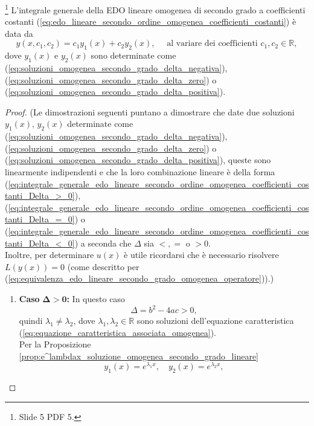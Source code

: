 \begin{theorem}\footnote{Slide 5 PDF 5.}
	L'integrale generale della EDO lineare omogenea di secondo grado a coefficienti costanti (\ref{eq:edo_lineare_secondo_ordine_omogenea_coefficienti_costanti}) è data da
	\begin{equation}\label{eq:integrale_generale_edo_lineare_secondo_ordine_omogenea_coefficienti_costanti}
		y(x,c_1,c_2) = c_1y_1(x) + c_2y_2(x),\quad \text{ al variare dei coefficienti } c_1,c_2\in\mathbb{R},
	\end{equation}
	dove $y_1(x)$ e $y_2(x)$ sono determinate come (\ref{eq:soluzioni_omogenea_secondo_grado_delta_negativa}), (\ref{eq:soluzioni_omogenea_secondo_grado_delta_zero}) o  (\ref{eq:soluzioni_omogenea_secondo_grado_delta_positiva}).
\end{theorem}
\begin{proof}
	(Le dimostrazioni seguenti puntano a dimostrare che date due soluzioni $y_1(x),\, y_2(x)$ determinate come (\ref{eq:soluzioni_omogenea_secondo_grado_delta_negativa}), (\ref{eq:soluzioni_omogenea_secondo_grado_delta_zero}) o  (\ref{eq:soluzioni_omogenea_secondo_grado_delta_positiva}), queste sono linearmente indipendenti e che la loro combinazione lineare è della forma (\ref{eq:integrale_generale_edo_lineare_secondo_ordine_omogenea_coefficienti_costanti_Delta_>_0}), (\ref{eq:integrale_generale_edo_lineare_secondo_ordine_omogenea_coefficienti_costanti_Delta_=_0}) o (\ref{eq:integrale_generale_edo_lineare_secondo_ordine_omogenea_coefficienti_costanti_Delta_<_0}) a seconda che $\Delta$ sia $<,=$ o $>0$.\\
	Inoltre, per determinare $u(x)$ è utile ricordarsi che è necessario risolvere $L(y(x))=0$ (come descritto per (\ref{eq:equivalenza_edo_lineare_secondo_grado_omogenea_operatore})).)
	\begin{enumerate}
		\item \textbf{Caso} $\boldsymbol{\Delta>0}$\textbf{:} In questo caso
		\begin{equation*}
			\Delta = b^2-4ac>0,
		\end{equation*}
		quindi $\lambda_1\neq \lambda_2$, dove $\lambda_1,\lambda_2\in\mathbb{R}$ sono soluzioni dell'equazione caratteristica (\ref{eq:equazione_caratteristica_associata_omogenea}).\\
			Per la Proposizione \ref{prop:e^lambdax_soluzione_omogenea_secondo_grado_lineare}
		\begin{equation*}
			y_1(x) = e^{\lambda_1 x},\quad y_2(x) = e^{\lambda_2 x},
		\end{equation*}

\end{enumerate}
\end{proof}
